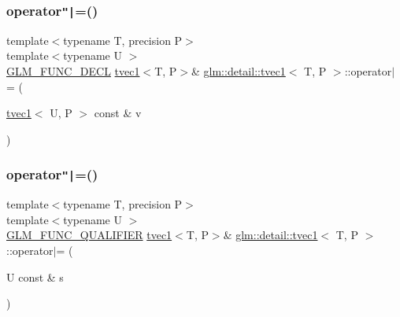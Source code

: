 \mbox{\label{structglm_1_1detail_1_1tvec1_a15ea891a329d3a5149263d7a9fb81b40}} 
\subsubsection{\texorpdfstring{operator\texttt{"|}=()}{operator|=()}\hspace{0.1cm}{\footnotesize\ttfamily [2/4]}}
{\footnotesize\ttfamily template$<$typename T, precision P$>$ \\
template$<$typename U $>$ \\
\hyperlink{setup_8hpp_ab2d052de21a70539923e9bcbf6e83a51}{G\+L\+M\+\_\+\+F\+U\+N\+C\+\_\+\+D\+E\+CL} \hyperlink{structglm_1_1detail_1_1tvec1}{tvec1}$<$T, P$>$\& \hyperlink{structglm_1_1detail_1_1tvec1}{glm\+::detail\+::tvec1}$<$ T, P $>$\+::operator$\vert$= (\begin{DoxyParamCaption}\item[{\hyperlink{structglm_1_1detail_1_1tvec1}{tvec1}$<$ U, P $>$ const \&}]{v }\end{DoxyParamCaption})}

\mbox{\label{structglm_1_1detail_1_1tvec1_ad7e5c9133ebfccdebec443c62e91c61e}} 
\subsubsection{\texorpdfstring{operator\texttt{"|}=()}{operator|=()}\hspace{0.1cm}{\footnotesize\ttfamily [3/4]}}
{\footnotesize\ttfamily template$<$typename T, precision P$>$ \\
template$<$typename U $>$ \\
\hyperlink{setup_8hpp_a33fdea6f91c5f834105f7415e2a64407}{G\+L\+M\+\_\+\+F\+U\+N\+C\+\_\+\+Q\+U\+A\+L\+I\+F\+I\+ER} \hyperlink{structglm_1_1detail_1_1tvec1}{tvec1}$<$T, P$>$\& \hyperlink{structglm_1_1detail_1_1tvec1}{glm\+::detail\+::tvec1}$<$ T, P $>$\+::operator$\vert$= (\begin{DoxyParamCaption}\item[{U const \&}]{s }\end{DoxyParamCaption})}



